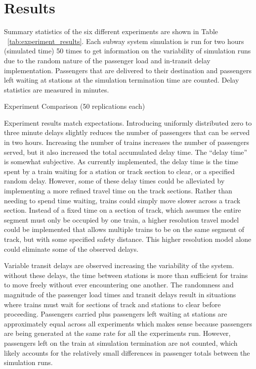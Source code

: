\section{Results}

Summary statistics of the six different experiments are shown in Table
~\ref{tab:experiment_results}. Each subway system simulation is run for two
hours (simulated time) 50 times to get information on the variability of
simulation runs due to the random nature of the passenger load and in-transit delay implementation. Passengers that are delivered to their destination and passengers left waiting at stations at the simulation termination time are counted.  Delay statistics are measured in minutes.

\begin{sidewaystable}
    \centering
    \caption{Experiment Comparison (50 replications each)}
    \label{tab:experiment_results}
\end{sidewaystable}

Experiment results match expectations. Introducing uniformly distributed zero
to three minute delays slightly reduces the number of passengers that can be 
served in two hours. Increasing the number of trains increases the number of 
passengers served, but it also increased the total accumulated delay time. The ``delay time'' is somewhat subjective.  As currently implemented, the delay time is the time spent by a train waiting for a station or track section to clear, or a specified random delay.  However, some of these delay times could be alleviated by implementing a more refined travel time on the track sections.  Rather than needing to spend time waiting, trains could simply move slower across a track section.  Instead of a fixed time on a section of track, which assumes the entire segment must only be occupied by one train, a higher resolution travel model could be implemented that allows multiple trains to be on the same segment of track, but with some specified safety distance.  This higher resolution model alone could eliminate some of the observed delays.

Variable transit delays are observed increasing the variability of the system.  without these delays, the time between stations is more than sufficient for trains to move freely without ever encountering one another.  The randomness and magnitude of the passenger load times and transit delays result in situations where trains must wait for sections of track and stations to clear before proceeding.  Passengers carried plus passengers left waiting at stations are approximately equal across all experiments which makes sense because passengers are being generated at the same rate for all the experiments run.  However, passengers left on the train at simulation termination are not counted, which likely accounts for the relatively small differences in passenger totals between the simulation runs.

